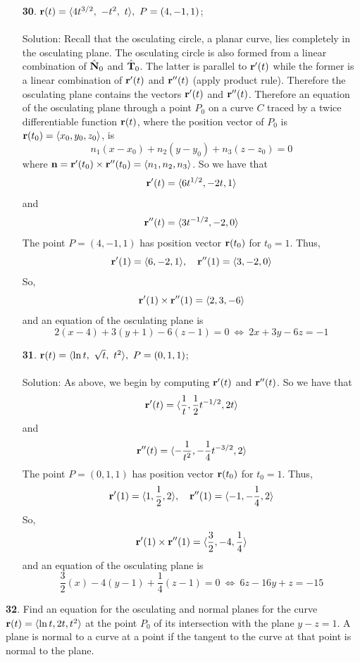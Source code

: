 \documentclass[12pt]{amsbook}
\newcommand{\la}{\langle}
\newcommand{\ra}{\rangle}
\begin{document}
\begin{enumerate}
  \item[{\small\bf 30}.] ${\bf r}(t)=\la 4t^{3/2},\ -t^2 ,\ t\ra, \ P=(4,-1,1)$;
  \\
  \\
  {\sc Solution}: Recall that the osculating circle, a planar curve, lies completely in the osculating plane. The osculating circle is also formed from a linear combination of $\hat{\bf N}_0$ and $\hat{\bf T}_0$. The latter is parallel to ${\bf r}'(t)$ while the former is a linear combination of ${\bf r}'(t)$ and ${\bf r}''(t)$ (apply product rule). Therefore the osculating plane contains the vectors ${\bf r}'(t)$ and ${\bf r}''(t)$. Therefore an equation of the osculating plane through a point $P_0$ on a curve $C$ traced by a twice differentiable function ${\bf r}(t)$, where the position vector of $P_0$ is ${\bf r}(t_0)=\la x_0,y_0,z_0 \ra$, is
  $$n_1(x-x_0)+n_2(y-y_0)+n_3(z-z_0)=0$$
  where ${\bf n}={\bf r}'(t_0)\times{\bf r}''(t_0)=\la n_1,n_2,n_3 \ra$. So we have that
  $${\bf r}'(t)=\la 6t^{1/2}, -2t, 1 \ra$$
  and
  $${\bf r}''(t)=\la 3t^{-1/2}, -2, 0 \ra$$
  The point $P=(4,-1,1)$ has position vector ${\bf r}(t_0)$ for $t_0=1$. Thus,
  $${\bf r}'(1)=\la 6,-2, 1 \ra, \ \ \  {\bf r}''(1)=\la 3,-2,0 \ra$$
  So,
  $${\bf r}'(1)\times{\bf r}''(1)=\la 2,3,-6 \ra$$
  and an equation of the osculating plane is
  $$2(x-4)+3(y+1)-6(z-1)=0 \ \Leftrightarrow \ 2x+3y-6z=-1$$
  \item[{\small\bf 31}.] ${\bf r}(t)=\la \ln t,\ \sqrt{t},\ t^2\ra, \ P=(0,1,1)$;
  \\
  \\
  {\sc Solution}: As above, we begin by computing ${\bf r}'(t)$ and ${\bf r}''(t)$. So we have that
  $${\bf r}'(t)=\la \frac{1}{t}, \frac{1}{2}t^{-1/2} , 2t\ra$$
  and
  $${\bf r}''(t)=\la -\frac{1}{t^2}, -\frac{1}{4}t^{-3/2}, 2 \ra$$
  The point $P=(0,1,1)$ has position vector ${\bf r}(t_0)$ for $t_0=1$. Thus,
  $${\bf r}'(1)=\la 1, \frac{1}{2},2 \ra, \ \ \  {\bf r}''(1)=\la -1,-\frac{1}{4},2 \ra$$
  So,
  $${\bf r}'(1)\times{\bf r}''(1)=\la \frac{3}{2},-4,\frac{1}{4} \ra$$
  and an equation of the osculating plane is
  $$\frac{3}{2}(x)-4(y-1)+\frac{1}{4}(z-1)=0 \ \Leftrightarrow \ 6z-16y+z=-15$$
\end{enumerate}
{\small\bf 32}. Find an equation for the osculating and normal planes for the curve ${\bf r}(t)=\la \ln t, 2t, t^2 \ra$ at the point $P_0$ of its intersection with the plane $y-z=1$. A plane is normal to a curve at a point if the tangent to the curve at
that point is normal to the plane.
\end{document}
